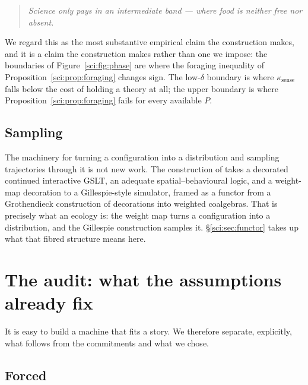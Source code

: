 \begin{quote}
\itshape Science only pays in an intermediate band --- where food is neither free nor absent.
\end{quote}

We regard this as the most substantive empirical claim the construction makes, and it is a claim the
construction makes rather than one we impose: the boundaries of Figure~\ref{sci:fig:phase} are where the
foraging inequality of Proposition~\ref{sci:prop:foraging} changes sign. The low-$\delta$ boundary is
where $\kappa_{\mathrm{sense}}$ falls below the cost of holding a theory at all; the upper boundary is
where Proposition~\ref{sci:prop:foraging} fails for every available $P$.

\subsection{Sampling}\label{sci:S13.3}

The machinery for turning a configuration into a distribution and sampling trajectories through it is
not new work. The construction of \cite{StochSim} takes a decorated continued interactive GSLT, an
adequate spatial--behavioural logic, and a weight-map decoration to a Gillespie-style simulator,
framed as a functor from a Grothendieck construction of decorations into weighted coalgebras. That is
precisely what an ecology is: the weight map turns a configuration into a distribution, and the
Gillespie construction samples it. \S\ref{sci:sec:functor} takes up what that fibred structure means here.

\section{The audit: what the assumptions already fix}\label{sci:S14}
\label{sci:sec:audit}

It is easy to build a machine that fits a story. We therefore separate, explicitly, what follows from
the commitments and what we chose.

\subsection{Forced}\label{sci:S14.1}

